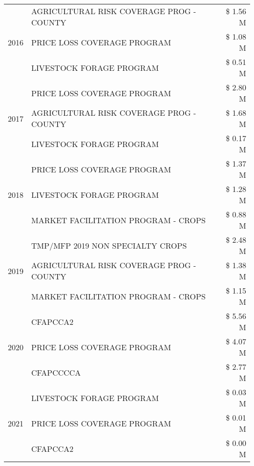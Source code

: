 \begin{tabular}{llr}
\cline{1-3}
\multirow[t]{3}{*}{2016} & AGRICULTURAL RISK COVERAGE PROG - COUNTY & \$ 1.56 M \\
 & PRICE LOSS COVERAGE PROGRAM & \$ 1.08 M \\
 & LIVESTOCK FORAGE PROGRAM & \$ 0.51 M \\
\cline{1-3}
\multirow[t]{3}{*}{2017} & PRICE LOSS COVERAGE PROGRAM & \$ 2.80 M \\
 & AGRICULTURAL RISK COVERAGE PROG - COUNTY & \$ 1.68 M \\
 & LIVESTOCK FORAGE PROGRAM & \$ 0.17 M \\
\cline{1-3}
\multirow[t]{3}{*}{2018} & PRICE LOSS COVERAGE PROGRAM & \$ 1.37 M \\
 & LIVESTOCK FORAGE PROGRAM & \$ 1.28 M \\
 & MARKET FACILITATION PROGRAM - CROPS & \$ 0.88 M \\
\cline{1-3}
\multirow[t]{3}{*}{2019} & TMP/MFP 2019 NON SPECIALTY CROPS & \$ 2.48 M \\
 & AGRICULTURAL RISK COVERAGE PROG - COUNTY & \$ 1.38 M \\
 & MARKET FACILITATION PROGRAM - CROPS & \$ 1.15 M \\
\cline{1-3}
\multirow[t]{3}{*}{2020} & CFAPCCA2 & \$ 5.56 M \\
 & PRICE LOSS COVERAGE PROGRAM & \$ 4.07 M \\
 & CFAPCCCCA & \$ 2.77 M \\
\cline{1-3}
\multirow[t]{3}{*}{2021} & LIVESTOCK FORAGE PROGRAM & \$ 0.03 M \\
 & PRICE LOSS COVERAGE PROGRAM & \$ 0.01 M \\
 & CFAPCCA2 & \$ 0.00 M \\
\cline{1-3}
\bottomrule
\end{tabular}
